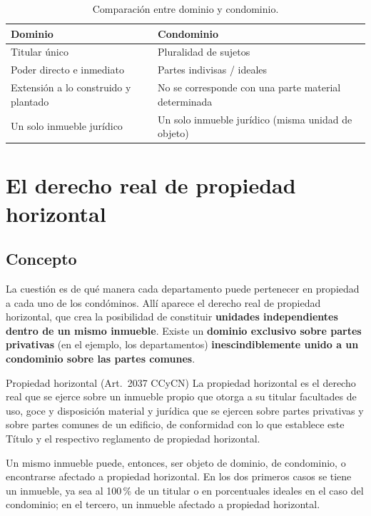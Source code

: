 \documentclass[12pt,oneside]{book}
\begin{document}
\begin{table}[H]
\centering
\begin{tabularx}{\textwidth}{
    >{\raggedright\arraybackslash}X
    >{\raggedright\arraybackslash}X
}
\toprule
\textbf{Dominio} & \textbf{Condominio} \\
\midrule
Titular único & Pluralidad de sujetos \\
Poder directo e inmediato & Partes indivisas / ideales \\
Extensión a lo construido y plantado & No se corresponde con una parte material determinada \\
Un solo inmueble jurídico & Un solo inmueble jurídico (misma unidad de objeto) \\
\bottomrule
\end{tabularx}
\caption{Comparación entre dominio y condominio.}
\end{table}

\section{El derecho real de propiedad horizontal}

\subsection{Concepto}

La cuestión es de qué manera cada departamento puede pertenecer en propiedad a cada uno de los condóminos. Allí aparece el derecho real de propiedad horizontal, que crea la posibilidad de constituir \textbf{unidades independientes dentro de un mismo inmueble}. Existe un \textbf{dominio exclusivo sobre partes privativas} (en el ejemplo, los departamentos) \textbf{inescindiblemente unido a un condominio sobre las partes comunes}.

\begin{definition}{Propiedad horizontal (Art.~2037 CCyCN)}
La propiedad horizontal es el derecho real que se ejerce sobre un inmueble propio que otorga a su titular facultades de uso, goce y disposición material y jurídica que se ejercen sobre partes privativas y sobre partes comunes de un edificio, de conformidad con lo que establece este Título y el respectivo reglamento de propiedad horizontal.
\end{definition}

Un mismo inmueble puede, entonces, ser objeto de dominio, de condominio, o encontrarse afectado a propiedad horizontal. En los dos primeros casos se tiene un inmueble, ya sea al 100\,\% de un titular o en porcentuales ideales en el caso del condominio; en el tercero, un inmueble afectado a propiedad horizontal.
\end{document}
